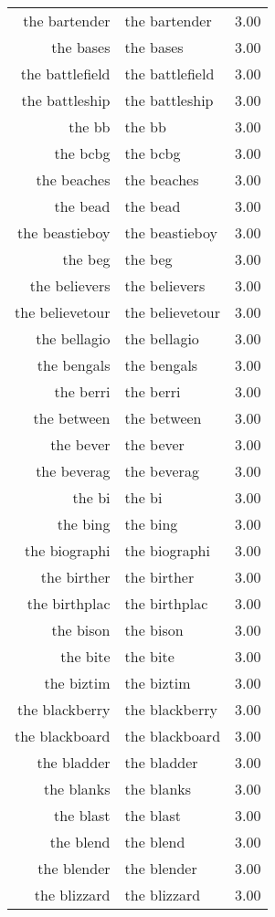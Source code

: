 \begin{table}[ht]
\begin{tabular}{rlr}
  the bartender & the bartender & 3.00 \\ 
  the bases & the bases & 3.00 \\ 
  the battlefield & the battlefield & 3.00 \\ 
  the battleship & the battleship & 3.00 \\ 
  the bb & the bb & 3.00 \\ 
  the bcbg & the bcbg & 3.00 \\ 
  the beaches & the beaches & 3.00 \\ 
  the bead & the bead & 3.00 \\ 
  the beastieboy & the beastieboy & 3.00 \\ 
  the beg & the beg & 3.00 \\ 
  the believers & the believers & 3.00 \\ 
  the believetour & the believetour & 3.00 \\ 
  the bellagio & the bellagio & 3.00 \\ 
  the bengals & the bengals & 3.00 \\ 
  the berri & the berri & 3.00 \\ 
  the between & the between & 3.00 \\ 
  the bever & the bever & 3.00 \\ 
  the beverag & the beverag & 3.00 \\ 
  the bi & the bi & 3.00 \\ 
  the bing & the bing & 3.00 \\ 
  the biographi & the biographi & 3.00 \\ 
  the birther & the birther & 3.00 \\ 
  the birthplac & the birthplac & 3.00 \\ 
  the bison & the bison & 3.00 \\ 
  the bite & the bite & 3.00 \\ 
  the biztim & the biztim & 3.00 \\ 
  the blackberry & the blackberry & 3.00 \\ 
  the blackboard & the blackboard & 3.00 \\ 
  the bladder & the bladder & 3.00 \\ 
  the blanks & the blanks & 3.00 \\ 
  the blast & the blast & 3.00 \\ 
  the blend & the blend & 3.00 \\ 
  the blender & the blender & 3.00 \\ 
  the blizzard & the blizzard & 3.00 \\ 

\end{tabular}
\end{table}
